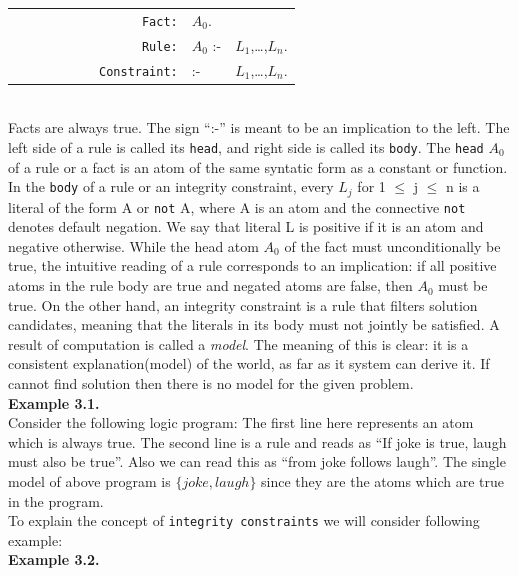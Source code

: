 \documentclass[14pt,a4paper, titlepage]{article}
\begin{document}
\begin{tabular}{ c c c c c c r l l }

 & & & & & & \texttt{Fact:} & $ A_0. $ \\
 & & & & & & \texttt{Rule:} & $ A_0 $ :- &  $L_1$,\dots,$L_n$. \\
 & & & & & & \texttt{Constraint:} & :- & $ L_1$,\dots,$L_n$.   \\

\end{tabular}
\\Facts are always true. The sign \enquote{:-} is meant to be an implication to the left. The left side of a rule is called its \texttt{head}, and right side is called its \texttt{body}. The \texttt{head} $A_0$ of a rule or a fact is an atom of the same syntatic form as a constant or function. In the \texttt{body} of a rule or an integrity constraint, every $L_j$ for 1 $\leq$ j $\leq$ n is a literal of the form A or \texttt{not} A, where A is an atom and the connective \texttt{not} denotes default negation. We say that literal L is positive if it is an atom and negative otherwise. While the head atom $A_0$ of the fact must unconditionally be true, the intuitive reading of a rule corresponds to an implication: if all positive atoms in the rule body are true and negated atoms are false, then $A_0$ must be true. On the other hand, an integrity constraint is a rule that filters solution candidates, meaning that the literals in its body must not jointly be satisfied. A result of \dlvhex{} computation is called a \textit{model}. The meaning of this is clear: it is a consistent explanation(model) of the world, as far as it system can derive it. If \dlvhex{} cannot find solution then there is no model for the given problem. \\ \textbf{Example 3.1.} \medskip \\Consider the following logic program: The first line here represents an atom which is always true. The second line is a rule and reads as \enquote{If joke is true, laugh must also be true}. Also we can read this as \enquote{from joke follows laugh}. The single model of above program is $\{joke, laugh\}$ since they are the atoms which are true in the program. \\To explain the concept of \texttt{integrity constraints} we will consider following example:\medskip \\ \textbf{Example 3.2.}

\end{document}
